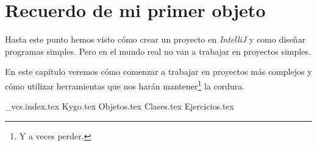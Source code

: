 \chapter{Recuerdo de mi primer objeto}
  Hasta este punto hemos visto cómo crear un proyecto en \textit{IntelliJ} y como diseñar programas
  simples.
  Pero en el mundo real no van a trabajar en proyectos simples.
  
  En este capítulo veremos cómo comenzar a trabajar en proyectos más complejos y cómo utilizar
  herramientas que nos harán mantener\footnote{Y a veces perder.} la cordura.

  {_vcs.index.tex}
  {Kygo.tex}
  {Objetos.tex}
  {Clases.tex}
  {Ejercicios.tex}
  \nocite{*}
  \printbibliography[keyword=oop]
